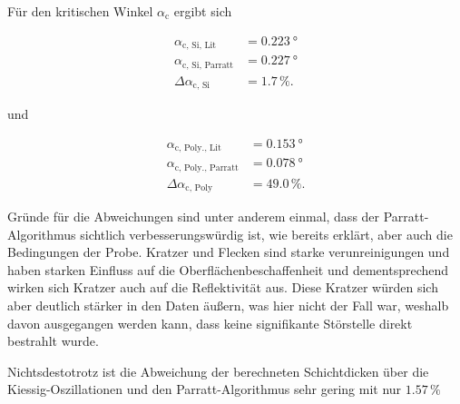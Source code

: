 Für den kritischen Winkel $\alpha_\text{c}$ ergibt sich

\begin{align*}
    \alpha_\text{c, Si, Lit} &= \qty{0.223}{\degree} \\
    \alpha_\text{c, Si, Parratt} &= \qty{0.227}{\degree} \\
    \Delta \alpha_\text{c, Si} &= \num{1.7} \, \%.
\end{align*}

und 

\begin{align*}
    \alpha_\text{c, Poly., Lit} &= \qty{0.153}{\degree} \\
    \alpha_\text{c, Poly., Parratt} &= \qty{0.078}{\degree} \\
    \Delta \alpha_\text{c, Poly} &= \num{49.0} \, \%.
\end{align*}

Gründe für die Abweichungen sind unter anderem einmal, dass der Parratt-Algorithmus sichtlich verbesserungswürdig ist, wie bereits erklärt,
aber auch die Bedingungen der Probe. Kratzer und Flecken sind starke verunreinigungen und haben starken Einfluss auf die Oberflächenbeschaffenheit und dementsprechend
wirken sich Kratzer auch auf die Reflektivität aus. Diese Kratzer würden sich aber deutlich stärker in den Daten äußern, was hier nicht der Fall war, weshalb davon ausgegangen werden kann, 
dass keine signifikante Störstelle direkt bestrahlt wurde.

Nichtsdestotrotz ist die Abweichung der berechneten Schichtdicken über die Kiessig-Oszillationen und den Parratt-Algorithmus 
sehr gering mit nur $\num{1.57} \, \%$